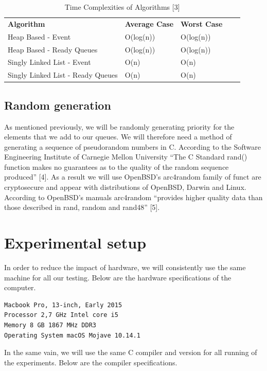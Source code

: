 \documentclass[12pt]{article}
\begin{document}
\begin{table}[h]
\caption{ Time Complexities of Algorithms [3]}
\begin{tabular}{|l|l|l|ll}
\cline{1-3}
\textbf{Algorithm}                & \textbf{Average Case} & \textbf{Worst Case} &  &  \\ \cline{1-3}Heap Based - Event                & O(log(n))    & O(log(n))  &  &  \\ \cline{1-3}
Heap Based - Ready Queues         & O(log(n))    & O(log(n))  &  &  \\ \cline{1-3}
Singly Linked List - Event        & O(n)         & O(n)       &  &  \\ \cline{1-3}
Singly Linked List - Ready Queues & O(n)         & O(n)       &  &  \\ \cline{1-3}
\end{tabular}
\end{table}

\subsection{Random generation}

As mentioned previously, we will be randomly generating priority for the elements that we add to our queues. We will therefore need a method of generating a sequence of pseudorandom numbers in C. According to the Software Engineering Institute of Carnegie Mellon University “The C Standard rand() function makes no guarantees as to the quality of the random sequence produced” [4]. As a result we will use OpenBSD’s arc4random family of funct are cryptosecure and appear with distributions of OpenBSD, Darwin and Linux. According to OpenBSD’s manuals arc4random “provides higher quality data than those described in rand, random and rand48” [5]. 

\section{Experimental setup}

In order to reduce the impact of hardware, we will consistently use the same machine for all our testing. Below are the hardware specifications of the computer.

\begin{verbatim}
Macbook Pro, 13-inch, Early 2015
Processor 2,7 GHz Intel core i5
Memory 8 GB 1867 MHz DDR3
Operating System macOS Mojave 10.14.1
\end{verbatim}

In the same vain, we will use the same C compiler and version for all running of the experiments. Below are the compiler specifications.
\end{document}
